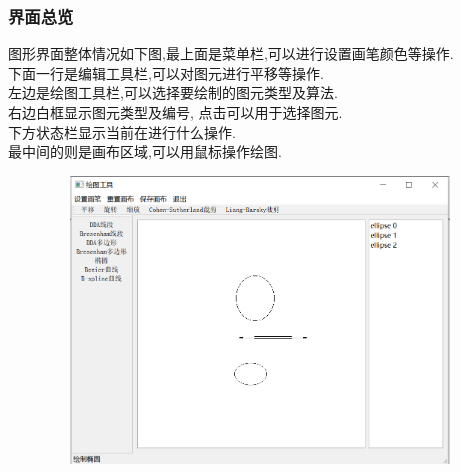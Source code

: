 \documentclass[a4paper,UTF8]{article}
\theoremstyle{definition}
\begin{document}
\subsubsection{界面总览}
图形界面整体情况如下图,最上面是菜单栏,可以进行设置画笔颜色等操作.\\
\indent 下面一行是编辑工具栏,可以对图元进行平移等操作.\\
\indent 左边是绘图工具栏,可以选择要绘制的图元类型及算法.\\
\indent 右边白框显示图元类型及编号, 点击可以用于选择图元.\\
\indent 下方状态栏显示当前在进行什么操作.\\
\indent 最中间的则是画布区域,可以用鼠标操作绘图.
\begin{figure}[H]
	\includegraphics[width=5in,height=3in]{total.png}
\end{figure}
\end{document}
